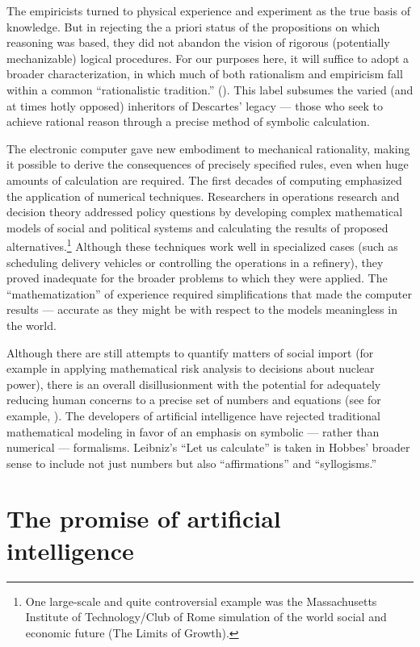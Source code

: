 \documentclass[12pt]{article}
\begin{document}
The empiricists turned to physical experience and experiment as the true basis of knowledge. But in rejecting the a priori status of the propositions on which reasoning was based, they did not abandon the vision of rigorous (potentially mechanizable) logical procedures. For our purposes here, it will suffice to adopt a broader characterization, in which much of both rationalism and empiricism fall within a common ``rationalistic tradition.'' (\cite{winograd1986}). This label subsumes the varied (and at times hotly opposed) inheritors of Descartes' legacy --- those who seek to achieve rational reason through a precise method of symbolic calculation.

The electronic computer gave new embodiment to mechanical rationality, making it possible to derive the consequences of precisely specified rules, even when huge amounts of calculation are required. The first decades of computing emphasized the application of numerical techniques. Researchers in operations research and decision theory addressed policy questions by developing complex mathematical models of social and political systems and calculating the results of proposed alternatives.\footnote{One large-scale and quite controversial example was the Massachusetts Institute of Technology/Club of Rome simulation of the world social and economic future
(The Limits of Growth).}
Although these techniques work well in specialized cases (such as scheduling delivery vehicles or controlling the operations in a refinery), they proved inadequate for the broader problems to which they were applied. The ``mathematization'' of experience required simplifications that made the computer results --- accurate as they might be with respect to the models meaningless in the world.

Although there are still attempts to quantify matters of social import (for example in applying mathematical risk analysis to decisions about nuclear power), there is an overall disillusionment with the potential for adequately reducing human concerns to a precise set of numbers and equations (see for example, \cite{davis1986}). The developers of artificial intelligence have rejected traditional mathematical modeling in favor of an emphasis on symbolic --- rather than numerical --- formalisms. Leibniz's ``Let us calculate'' is taken in Hobbes' broader sense to include not just numbers but also ``affirmations'' and ``syllogisms.''

\section{The promise of artificial intelligence}
\end{document}
